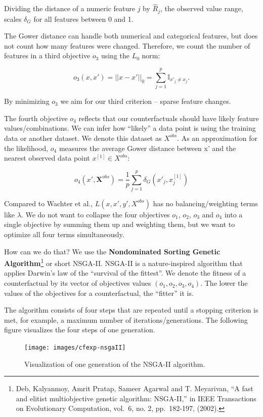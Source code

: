 \documentclass[
  10pt,
]{scrbook}
\begin{document}
Dividing the distance of a numeric feature \(j\) by \(\widehat{R}_j\), the observed value range, scales \(\delta_G\) for all features between 0 and 1.

The Gower distance can handle both numerical and categorical features, but does not count how many features were changed.
Therefore, we count the number of features in a third objective \(o_3\) using the \(L_0\) norm:

\[o_3(x,x')=||x-x'||_0=\sum_{j=1}^{p}\mathbb{I}_{x'_j\neq x_j}.\]

By minimizing \(o_3\) we aim for our third criterion -- sparse feature changes.

The fourth objective \(o_4\) reflects that our counterfactuals should have likely feature values/combinations.
We can infer how ``likely'' a data point is using the training data or another dataset.
We denote this dataset as \(X^{obs}\).
As an approximation for the likelihood, \(o_4\) measures the average Gower distance between x' and the nearest observed data point \(x^{[1]}\in{}X^{obs}\):

\[o_4(x',\textbf{X}^{obs})=\frac{1}{p}\sum_{j=1}^{p}\delta_G(x'_j,x^{[1]}_j)\]

Compared to Wachter et al., \(L(x,x',y',X^{obs})\) has no balancing/weighting terms like \(\lambda\).
We do not want to collapse the four objectives \(o_1\), \(o_2\), \(o_3\) and \(o_4\) into a single objective by summing them up and weighting them, but we want to optimize all four terms simultaneously.

How can we do that?
We use the \textbf{Nondominated Sorting Genetic Algorithm}\footnote{Deb, Kalyanmoy, Amrit Pratap, Sameer Agarwal and T. Meyarivan, ``A fast and elitist multiobjective genetic algorithm: NSGA-II,'' in IEEE Transactions on Evolutionary Computation, vol.~6, no. 2, pp.~182-197, (2002).} or short NSGA-II.
NSGA-II is a nature-inspired algorithm that applies Darwin's law of the ``survival of the fittest''.
We denote the fitness of a counterfactual by its vector of objectives values \((o_1,o_2,o_3,o_4)\).
The lower the values of the objectives for a counterfactual, the ``fitter'' it is.

The algorithm consists of four steps that are repeated until a stopping criterion is met, for example, a maximum number of iterations/generations.
The following figure visualizes the four steps of one generation.

\begin{figure}

{\centering \texttt{[image: images/cfexp-nsgaII]} 

}

\caption{Visualization of one generation of the NSGA-II algorithm.}\label{fig:nsgaII-cf}
\end{figure}
\end{document}
